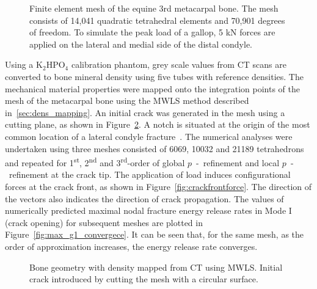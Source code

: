 \documentclass[onecolumn]{svjour3}
\begin{document}
\begin{figure}[h]
	\begin{center}
		\caption{Finite element mesh of the equine 3rd metacarpal bone. The mesh consists of 14,041 quadratic tetrahedral elements and 70,901 degrees of freedom. To simulate the peak load of a gallop, 5 kN forces are applied on the lateral and medial side of the distal condyle.}
		\label{fig:mc3_BC}
	\end{center}
\end{figure}
% 
% 
Using a $\mathrm {K_2 HPO_4}$ calibration phantom, grey scale values from CT scans are converted to bone mineral density using five tubes with reference densities. 
The mechanical material properties were mapped onto the integration points of the mesh of the metacarpal bone using the MWLS method described in~\ref{sec:dens_mapping}. 
% 
An initial crack was generated in the mesh using a cutting plane, as shown in Figure~\ref{fig:bone_ct_mesh_cut}. A notch is situated at the origin of the most common location of a lateral condyle fracture~\cite{jacklin2012frequency}. 
The numerical analyses were undertaken using three meshes consisted of 6069, 10032 and 21189 tetrahedrons and repeated for 1\textsuperscript{st}, 2\textsuperscript{nd} and 3\textsuperscript{rd}-order of global $p$~-~refinement and local $p$~-~refinement at the crack tip. 
% 
The application of load induces configurational forces at the crack front, as shown in Figure~\ref{fig:crackfrontforce}. 
The direction of the vectors also indicates the direction of crack propagation.
The values of numerically predicted maximal nodal fracture energy release rates in Mode I (crack opening) for subsequent meshes are plotted in Figure~\ref{fig:max_g1_convergece}. 
It can be seen that, for the same mesh, as the order of approximation increases, the energy release rate converges. 
\begin{figure}[h]
	\centering
		\def\svgwidth{7cm}
		
	\caption{Bone geometry with density mapped from CT using MWLS. Initial crack introduced by cutting the mesh with a circular surface.}
	\label{fig:bone_ct_mesh_cut}
\end{figure}
\end{document}
